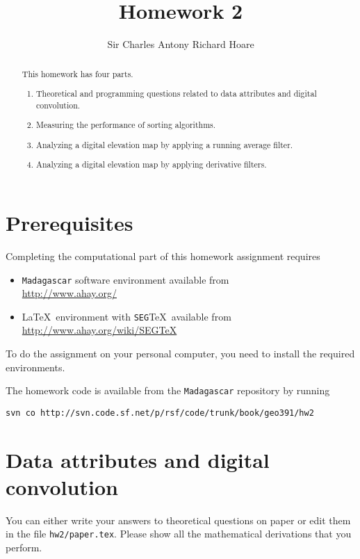 \author{Sir Charles Antony Richard Hoare}
\title{Homework 2}

\begin{abstract}
  This homework has four parts. 
  \begin{enumerate}
  \item Theoretical and programming questions related to data attributes and digital convolution.  
  \item Measuring the performance of sorting algorithms.
  \item Analyzing a digital elevation map by applying a running average filter.
  \item Analyzing a digital elevation map by applying derivative filters.
  \end{enumerate}
\end{abstract}

\section{Prerequisites}

Completing the computational part of this homework assignment requires
\begin{itemize}
\item \texttt{Madagascar} software environment available from \\
\url{http://www.ahay.org/}
\item \LaTeX\ environment with \texttt{SEG}\TeX\ available from \\ 
\url{http://www.ahay.org/wiki/SEGTeX}
\end{itemize}
To do the assignment on your personal computer, you need to install
the required environments. 

The homework code is available from the \texttt{Madagascar} repository
by running
\begin{verbatim}
svn co http://svn.code.sf.net/p/rsf/code/trunk/book/geo391/hw2
\end{verbatim}

\section{Data attributes and digital convolution}

You can either write your answers to theoretical questions on paper or
edit them in the file \texttt{hw2/paper.tex}. Please show all the
mathematical derivations that you perform.

